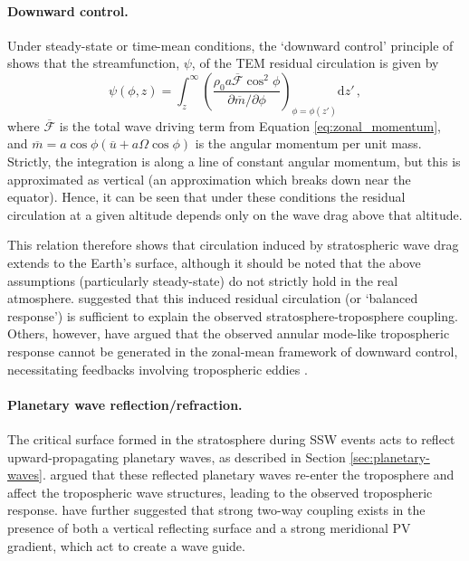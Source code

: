 \paragraph{Downward control.} Under steady-state or time-mean conditions, the
`downward control' principle of \citet{Haynes1991} shows that the
streamfunction, $\psi$, of the TEM residual circulation is given by
\begin{equation}
  \psi(\phi,z) =
  \int_z^{\infty}\left(\frac{\rho_0a\overline{\mathcal{F}}\cos^2\phi}{\partial\overline{m}/\partial\phi}\right)_{\phi=\phi(z')}\mathrm{d}z'\, ,
\end{equation}
where $\overline{\mathcal{F}}$ is the total wave driving term from Equation
\ref{eq:zonal_momentum}, and
$\overline{m}=a\cos\phi(\overline{u}+a\Omega\cos\phi)$ is the angular momentum
per unit mass. Strictly, the integration is along a line of constant angular
momentum, but this is approximated as vertical (an approximation which breaks
down near the equator). Hence, it can be seen that under these conditions the
residual circulation at a given altitude depends only on the wave drag above
that altitude.

This relation therefore shows that circulation induced by stratospheric wave
drag extends to the Earth's surface, although it should be noted that the above
assumptions (particularly steady-state) do not strictly hold in the real
atmosphere. \citet{Thompson2006} suggested that this induced residual
circulation (or `balanced response') is sufficient to explain the observed
stratosphere-troposphere coupling. Others, however, have argued that the
observed annular mode-like tropospheric response cannot be generated in the
zonal-mean framework of downward control, necessitating feedbacks involving
tropospheric eddies \citep{Kushner2004, Song2004}.


\paragraph{Planetary wave reflection/refraction.} The critical surface formed in
the stratosphere during SSW events acts to reflect upward-propagating planetary
waves, as described in Section
\ref{sec:planetary-waves}. \citet{JudithPerlwitz2003} argued that these
reflected planetary waves re-enter the troposphere and affect the tropospheric
wave structures, leading to the observed tropospheric response. \citet{Shaw2010}
have further suggested that strong two-way coupling exists in the presence of
both a vertical reflecting surface and a strong meridional PV gradient, which
act to create a wave guide.

